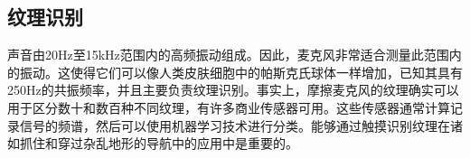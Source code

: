 
\subsection{纹理识别}
声音由20Hz至15kHz范围内的高频振动组成。因此，麦克风非常适合测量此范围内的振动。这使得它们可以像人类皮肤细胞中的帕斯克氏球体一样增加，已知其具有250Hz的共振频率，并且主要负责纹理识别。事实上，摩擦麦克风的纹理确实可以用于区分数十和数百种不同纹理\cite{hughes14}，有许多商业传感器可用。这些传感器通常计算记录信号的频谱，然后可以使用机器学习技术进行分类。能够通过触摸识别纹理在诸如抓住和穿过杂乱地形的导航中的应用中是重要的。




